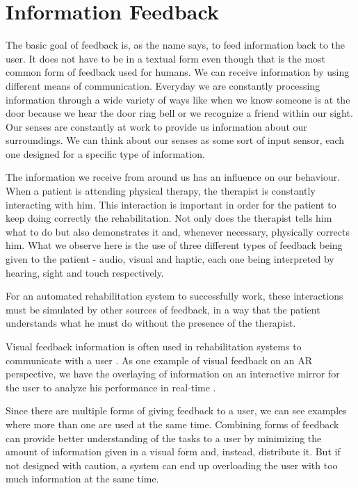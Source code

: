 \section{Information Feedback}
\label{RW-MF}

The basic goal of feedback is, as the name says, to feed information back to the user. 
It does not have to be in a textual form even though that is the most 
common form of feedback used for humans. We can receive information 
by using different means of communication. 
Everyday we are constantly processing information through a wide variety of ways like when 
we know someone is at the door because we hear the door ring bell or we recognize a friend within our sight.
Our senses are constantly at work to provide us information about our surroundings.
We can think about our senses as some sort of input sensor, each one designed for a specific type of information.

The information we receive from around us has an influence on our behaviour.
When a patient is attending physical therapy, the therapist is constantly interacting with him. 
This interaction is important in order for the patient to keep doing correctly the rehabilitation.
Not only does the therapist tells him what to do but also demonstrates it and, whenever necessary, physically corrects him.
What we observe here is the use of three different types of feedback being given to the patient - audio, visual and haptic,
each one being interpreted by hearing, sight and touch respectively.

For an automated rehabilitation system to successfully work, these interactions must 
be simulated by other sources of feedback, in a way that the patient understands 
what he must do without the presence of the therapist.

Visual feedback information is often used in rehabilitation systems to communicate with a user \cite{Design2005}. 
As one example of visual feedback on an \ac{AR} perspective, we have the overlaying of 
information on an interactive mirror for the user to analyze his performance in real-time \cite{Anderson,Tang2014a, Velloso2013, Klein2013,Alhamid2012a, blum2012}. 

Since there are multiple forms of giving feedback to a user, we can see examples where more than one are used at the same time.
Combining forms of feedback can provide better understanding of the tasks to a user by minimizing the amount of 
information given in a visual form and, instead, distribute it. 
But if not designed with caution, a system can end up overloading the user with too much information at the same time. 

